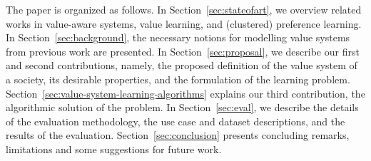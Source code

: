 \documentclass{ecai}
\begin{document}
The paper is organized as follows. In Section~\ref{sec:stateofart}, we overview related works in value-aware systems, value learning, and (clustered) preference learning. In Section~\ref{sec:background}, the necessary notions for modelling value systems from previous work are presented. In Section~\ref{sec:proposal}, we describe our first and second contributions, namely, the proposed definition of the value system of a society, its desirable properties, and the formulation of the learning problem. Section~\ref{sec:value-system-learning-algorithms} explains our third contribution, the algorithmic solution of the problem. In Section~\ref{sec:eval}, we describe the details of the evaluation methodology, the use case and dataset descriptions, and the results of the evaluation. Section~\ref{sec:conclusion} presents concluding remarks, limitations and some suggestions for future work.
\end{document}
